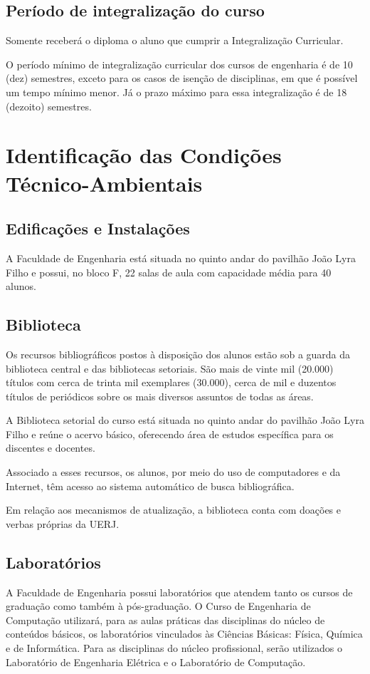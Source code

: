 \subsection{Período de integralização do curso}
\setcounter{artigo}{98}
\begin{itquotation}
	\artigo Somente receberá o diploma o aluno que cumprir a Integralização Curricular.
\end{itquotation}

O período mínimo de integralização curricular dos cursos de engenharia é de 10 (dez) semestres, exceto para os casos de isenção de disciplinas, em que é possível um tempo mínimo menor. Já o prazo máximo para essa integralização é de 18 (dezoito) semestres.


\section{Identificação das Condições Técnico-Ambientais}

\subsection{Edificações e Instalações}
A Faculdade de Engenharia está situada no quinto andar do pavilhão João Lyra Filho e possui, no bloco F, 22 salas de aula com capacidade média para 40 alunos.

\subsection{Biblioteca}
Os recursos bibliográficos postos à disposição dos alunos estão sob a guarda da biblioteca central e das bibliotecas setoriais. São mais de vinte mil (20.000) títulos com cerca de trinta mil exemplares (30.000), cerca de mil e duzentos títulos de periódicos sobre os mais diversos assuntos de todas as áreas.

A Biblioteca setorial do curso está situada no quinto andar do pavilhão João Lyra Filho e reúne o acervo básico, oferecendo área de estudos específica para os discentes e docentes.

Associado a esses recursos, os alunos, por meio do uso de computadores e da Internet, têm acesso ao sistema automático de busca bibliográfica.

Em relação aos mecanismos de atualização, a biblioteca conta com doações e verbas próprias da UERJ.

\subsection{Laboratórios}
A Faculdade de Engenharia possui laboratórios que atendem tanto os cursos de graduação como também à pós-graduação. O Curso de Engenharia de Computação utilizará, para as aulas práticas das disciplinas do núcleo de conteúdos básicos, os laboratórios vinculados às Ciências Básicas: Física, Química e de Informática. Para as disciplinas do núcleo profissional, serão utilizados o Laboratório de Engenharia Elétrica e o Laboratório de Computação.

